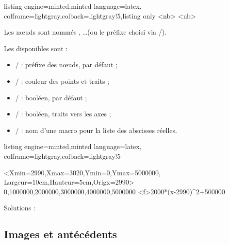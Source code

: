 \documentclass[11pt,a4paper]{ltxdoc}
\begin{document}
\begin{tcblisting}{listing engine=minted,minted language=latex,
  colframe=lightgray,colback=lightgray!5,listing only}
<nb>
<nb>
\end{tcblisting}

Les nœuds sont nommés , \ldots (ou le préfixe choisi via /).

\smallskip

Les \MontreCode{[clés]} disponibles sont :

\begin{itemize}
	\item {} /  : préfixe des nœuds,  par défaut ;
	\item {} /  : couleur des points et traits ;
	\item {} /  : booléen,  par défaut ;
	\item {} /  : booléen, traits vers les axes ;
	\item {} /  : nom d'une macro pour la liste des abscisses réelles.
\end{itemize}

\begin{tcblisting}{listing engine=minted,minted language=latex,
  colframe=lightgray,colback=lightgray!5}
\begin{tkzGrph}<Xmin=2990,Xmax=3020,Ymin=0,Ymax=5000000,
               Largeur=10cm,Hauteur=5cm,Origx=2990>
    {0,1000000,2000000,3000000,4000000,5000000}
  \tkzGrphDefineCurve[name=cf]<f>{2000*(x-2990)^2+500000}
\end{tkzGrph}

Solutions : \LISTRES
\end{tcblisting}

\pagebreak

\subsection{Images et antécédents}
\end{document}

